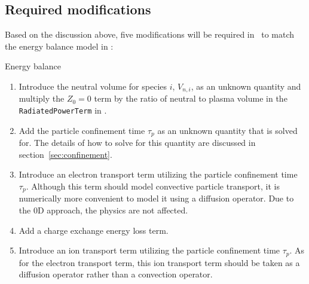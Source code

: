 \documentclass{notes}
\begin{document}
    \subsection{Required modifications}
    Based on the discussion above, five modifications will be required in \DREAM\
    to match the energy balance model in \DYON:
    \begin{summarybox}{Energy balance}
        \begin{enumerate}
            \item Introduce the neutral volume for species $i$, $V_{n,i}$, as an
            unknown quantity and multiply the $Z_0=0$ term by the ratio of
            neutral to plasma volume in the \texttt{RadiatedPowerTerm} in \DREAM.
            \item Add the particle confinement time $\tau_p$ as an unknown quantity
            that is solved for. The details of how to solve for this quantity are
            discussed in section~\ref{sec:confinement}.
            \item Introduce an electron transport term utilizing the particle
            confinement time $\tau_p$. Although this term should model convective
            particle transport, it is numerically more convenient to model it using
            a diffusion operator. Due to the 0D approach, the physics are not
            affected.
            \item Add a charge exchange energy loss term.
            \item Introduce an ion transport term utilizing the particle confinement
            time $\tau_p$. As for the electron transport term, this ion transport
            term should be taken as a diffusion operator rather than a convection
            operator.
        \end{enumerate}
    \end{summarybox}
\end{document}
